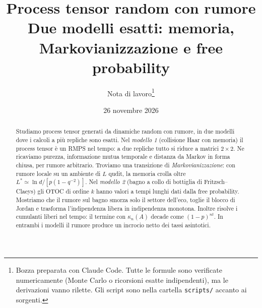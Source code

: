 \documentclass[11pt,a4paper]{article}
\title{\textbf{Process tensor random con rumore}\\[4pt]
\large Due modelli esatti: memoria, Markovianizzazione e free probability}
\author{Nota di lavoro\thanks{Bozza preparata con Claude Code. Tutte le formule sono verificate numericamente (Monte Carlo o ricorsioni esatte indipendenti), ma le derivazioni vanno rilette. Gli script sono nella cartella \texttt{scripts/} accanto ai sorgenti.}}
\date{26 novembre 2026}
\theoremstyle{plain}
\theoremstyle{definition}
\theoremstyle{remark}
\begin{document}
\maketitle
\begin{abstract}
\noindent Studiamo process tensor generati da dinamiche random con rumore, in due modelli dove i calcoli a più repliche sono esatti. Nel \emph{modello 1} (collisione Haar con memoria) il process tensor è un RMPS nel tempo: a due repliche tutto si riduce a matrici $2\times2$. Ne ricaviamo purezza, informazione mutua temporale e distanza da Markov in forma chiusa, per rumore arbitrario. Troviamo una transizione di \emph{Markovianizzazione}: con rumore locale su un ambiente di $L$ qudit, la memoria crolla oltre $L^*\simeq\ln d/[p(1-q^{-2})]$. Nel \emph{modello 2} (bagno a collo di bottiglia di Fritzsch--Claeys) gli OTOC di ordine $k$ hanno valori a tempi lunghi dati dalla free probability. Mostriamo che il rumore sul bagno smorza solo il settore dell'eco, toglie il blocco di Jordan e trasforma l'indipendenza libera in indipendenza monotona. Inoltre risolve i cumulanti liberi nel tempo: il termine con $\kappa_n(A)$ decade come $(1-p)^{nt}$. In entrambi i modelli il rumore produce un incrocio netto dei tassi asintotici.
\end{abstract}
\tableofcontents
\newpage






\appendix



\end{document}
